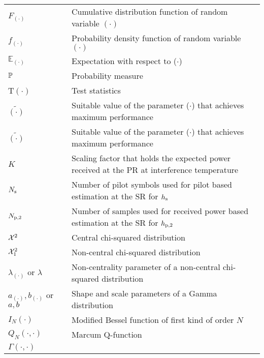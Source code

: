 \begin{longtable}{p{}p{}p{}}
       $F_{(\cdot)}$            & &          Cumulative distribution function of random variable $(\cdot)$ \\
       $f_{(\cdot)}$            & &          Probability density function of random variable $(\cdot)$ \\
       $\mathbb E_{(\cdot)}$    & &		Expectation with respect to ($\cdot$) \\
       $\mathbb P$                     & &     	Probability measure \\
       T$(\cdot)$  	        & &          Test statistics \\
       $\tilde{(\cdot)}$        & &		Suitable value of the parameter ($\cdot$) that achieves maximum performance \\
       $\tilde{(\cdot)}$        & &		Suitable value of the parameter ($\cdot$) that achieves maximum performance \\
       $K$                      & &      Scaling factor that holds the expected power received at the PR at interference temperature  \\
       $N_{\text{s}}$                    & &      Number of pilot symbols used for pilot based estimation at the SR for $h_{\text{s}}$ \\
       $N_{\text{p,2}}$                    & &      Number of samples used for received power based estimation at the SR for $h_{\text{p,2}}$ \\
       $\cchi2$                & &      Central chi-squared distribution \\
       $\ncchi2$                & &      Non-central chi-squared distribution \\
       $\lambda_{(\cdot)}$ or $\lambda$  &     &       Non-centrality parameter of a non-central chi-squared distribution \\
       $a_{(\cdot)}, b_{(\cdot)}$ or $a, b$ &  &       Shape and scale parameters of a Gamma distribution \\

       $I_{N}(\cdot)$	        & &	Modified Bessel function of first kind of order $N$ \\		
       $Q_{N}(\cdot, \cdot)$	& &	Marcum Q-function \\		
       $\Gamma(\cdot, \cdot)$	& &	\\		
\end{longtable}
  




